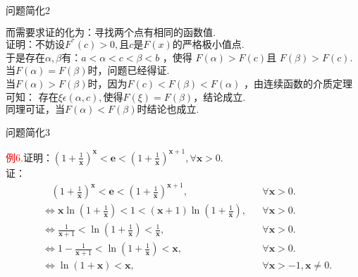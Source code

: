 \documentclass{beamer}
\begin{document}
\begin{frame}{问题简化2}
	\begin{spacing}{1.5}
		$\text{而需要求证的化为：寻找两个点有相同的函数值}.
		$
		$
		\text{证明：不妨设}F^{''}\left( c \right) >0,\text{且}c\text{是}F\left( x \right) \text{的严格极小值点}.
		$
		$
		\text{于是存在}\alpha ,\beta \text{有：}a<\alpha <c<\beta <b
		$
		，使得
		$F\left( \alpha \right) >F\left( c \right)
		$且
		$F\left( \beta \right) >F\left( c \right).
		$\\
		$
		\text{当}F\left( \alpha \right) =F\left( \beta \right) \text{时，问题已经得证}.
		$
		$
		\text{当}F\left( \alpha \right) >F\left( \beta \right) \text{时，因为}F\left( c \right) <F\left( \beta \right) <F\left( \alpha \right)
		$
		，由连续函数的介质定理可知：
		$
		\text{存在}\xi \epsilon \left( \alpha ,c \right) ,\text{使得}F\left( \xi \right) =F\left( \beta \right) \text{，结论成立.}
		$
		$
		\text{同理可证，当}F\left( \alpha \right) <F\left( \beta \right) \text{时结论也成立.}
		$
	\end{spacing}
\end{frame}

\begin{frame}{问题简化3}
	\begin{spacing}{1.0}
		\textcolor{red}{例6.}$
		\text{证明：}\left( 1+\frac{1}{\boldsymbol{x}} \right) ^{\boldsymbol{x}}<\boldsymbol{e}<\left( 1+\frac{1}{\boldsymbol{x}} \right) ^{\boldsymbol{x}+1},\forall \boldsymbol{x}>0.
		$\\
		证：
	\begin{equation*}
		\begin{aligned}
		&\ \ \ \ \left( 1+\frac{1}{\boldsymbol{x}} \right) ^{\boldsymbol{x}}<\boldsymbol{e}<\left( 1+\frac{1}{\boldsymbol{x}} \right) ^{\boldsymbol{x}+1},&&\forall \boldsymbol{x}>0.\\
		&\Leftrightarrow \boldsymbol{x}\ln \left( 1+\frac{1}{\boldsymbol{x}} \right) <1<\left( \boldsymbol{x}+1 \right) \ln \left( 1+\frac{1}{\boldsymbol{x}} \right),&& \forall \boldsymbol{x}>0.\\
		&\Leftrightarrow \frac{1}{\boldsymbol{x}+1}<\ln \left( 1+\frac{1}{\boldsymbol{x}} \right) <\frac{1}{\boldsymbol{x}},&&\forall \boldsymbol{x}>0.\\
		&\Leftrightarrow 1-\frac{1}{\boldsymbol{x}+1}<\ln \left( 1+\frac{1}{\boldsymbol{x}} \right) <\boldsymbol{x}, &&\forall \boldsymbol{x}>0.\\
		&\Leftrightarrow \ln \left( 1+\boldsymbol{x} \right) <\boldsymbol{x}, &&\forall \boldsymbol{x}>-1,\boldsymbol{x}\ne 0.
		\end{aligned}
	\end{equation*}
	\end{spacing}
\end{frame}
\end{document}
